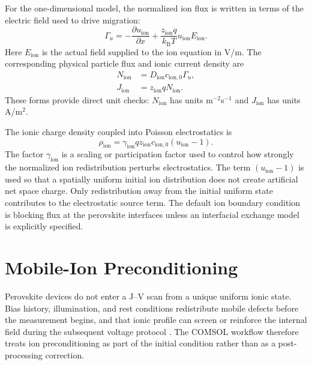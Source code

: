 For the one-dimensional model, the normalized ion flux is written in terms of
the electric field used to drive migration:
\begin{equation}
\Gamma_u
=-\frac{\partial u_{\mathrm{ion}}}{\partial x}
+\frac{z_{\mathrm{ion}}q}{k_{\mathrm{B}}T}
u_{\mathrm{ion}}E_{\mathrm{ion}} .
\label{eq:normalized_ion_flux}
\end{equation}
Here $E_{\mathrm{ion}}$ is the actual field supplied to the ion equation in
V/m. The corresponding physical particle flux and ionic current density are
\begin{align}
N_{\mathrm{ion}} &=D_{\mathrm{ion}}c_{\mathrm{ion},0}\Gamma_u,\\
J_{\mathrm{ion}} &=z_{\mathrm{ion}}qN_{\mathrm{ion}} .
\end{align}
These forms provide direct unit checks: $N_{\mathrm{ion}}$ has units
m$^{-2}$s$^{-1}$ and $J_{\mathrm{ion}}$ has units A/m$^2$.

The ionic charge density coupled into Poisson electrostatics is
\begin{equation}
\rho_{\mathrm{ion}}
=
\gamma_{\mathrm{ion}} q z_{\mathrm{ion}} c_{\mathrm{ion},0}
\left(u_{\mathrm{ion}}-1\right).
\label{eq:rho_ion}
\end{equation}
The factor $\gamma_{\mathrm{ion}}$ is a scaling or participation factor used to
control how strongly the normalized ion redistribution perturbs electrostatics.
The term $(u_{\mathrm{ion}}-1)$ is used so that a spatially uniform initial ion
distribution does not create artificial net space charge. Only redistribution
away from the initial uniform state contributes to the electrostatic source
term. The default ion boundary condition is blocking flux at the perovskite
interfaces unless an interfacial exchange model is explicitly specified.

\section{Mobile-Ion Preconditioning}

Perovskite devices do not enter a J--V scan from a unique uniform ionic state.
Bias history, illumination, and rest conditions redistribute mobile defects
before the measurement begins, and that ionic profile can screen or reinforce
the internal field during the subsequent voltage protocol
\cite{Eames_2015,Richardson_2016,Calado_2016}. The COMSOL workflow therefore
treats ion preconditioning as part of the initial condition rather than as a
post-processing correction.

